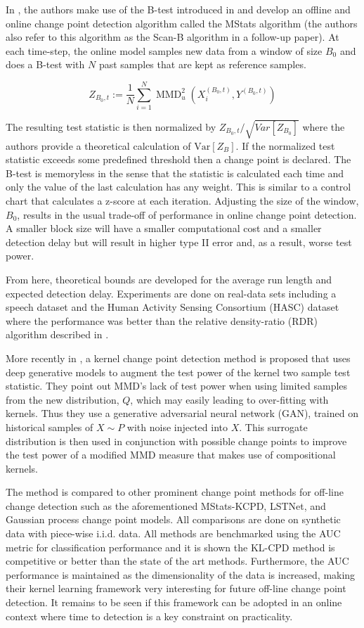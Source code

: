 In  \cite{li2015m}, the authors make use of the B-test introduced in \cite{zaremba2013b} and develop an offline and online change point detection algorithm called the MStats algorithm (the authors also refer to this algorithm as the Scan-B algorithm in a follow-up paper). At each time-step, the online model samples new data from a window of size $B_0$ and does a B-test with $N$ past samples that are kept as reference samples. 

$$Z_{B_{0}, t}:=\frac{1}{N} \sum_{i=1}^{N} \operatorname{MMD}_{u}^{2}\left(X_{i}^{\left(B_{0}, t\right)}, Y^{\left(B_{0}, t\right)}\right)$$

The resulting test statistic is then normalized by $Z_{B_{0}, t}/\sqrt{Var[Z_{B_0}]}$ where the authors provide a theoretical calculation of $\text{Var}[Z_B]$. If the normalized test statistic exceeds some predefined threshold then a change point is declared. The B-test is memoryless in the sense that the statistic is calculated each time and only the value of the last calculation has any weight. This is similar to a control chart that calculates a z-score at each iteration. Adjusting the size of the window, $B_0$, results in the usual trade-off of performance in online change point detection. A smaller block size will have a smaller computational cost and a smaller detection delay but will result in higher type II error and, as a result, worse test power.

From here, theoretical bounds are developed for the average run length and expected detection delay. Experiments are done on real-data sets including a speech dataset  and the Human Activity Sensing Consortium (HASC) dataset where the performance was better than the relative density-ratio (RDR) algorithm described in \cite{liu2013change}.

More recently in \cite{chang2019kernel}, a  kernel change point detection method is proposed that uses deep generative models to augment the test power of the kernel two sample test statistic. They point out MMD's lack of test power when using limited samples from the new distribution, $Q$, which may easily leading to over-fitting with kernels. Thus they use a generative adversarial neural network (GAN), trained on historical samples of $X \sim  P$  with noise injected into $X$. This surrogate distribution is then used in conjunction with possible change points to improve the test power of a modified MMD measure that makes use of compositional kernels.

The method is compared to other prominent change point methods for off-line  change detection such as the aforementioned MStats-KCPD, LSTNet, and Gaussian process change point models. All comparisons are done on synthetic data with piece-wise i.i.d. data. All methods are benchmarked using the AUC metric for classification performance and it is shown the KL-CPD method is competitive or better than the state of the art methods.  Furthermore, the AUC performance is maintained as the dimensionality of the data is increased, making their kernel learning framework very interesting for future off-line change point detection. It remains to be seen if this framework can be adopted in an online context where time to detection is a key constraint on practicality.

